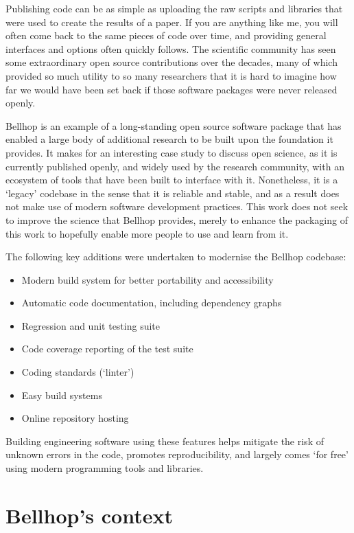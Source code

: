\documentclass[twocolumn]{willarticle}
\begin{document}
Publishing code can be as simple as uploading the raw scripts and libraries that were used to create the results of a paper.
If you are anything like me, you will often come back to the same pieces of code over time, and providing general interfaces and options often quickly follows.
The scientific community has seen some extraordinary open source contributions over the decades, many of which provided so much utility to so many researchers that it is hard to imagine how far we would have been set back if those software packages were never released openly.

Bellhop is an example of a long-standing open source software package that has enabled a large body of additional research to be built upon the foundation it provides.
It makes for an interesting case study to discuss open science, as it is currently published openly, and widely used by the research community, with an ecosystem of tools that have been built to interface with it.
Nonetheless, it is a `legacy' codebase in the sense that it is reliable and stable, and as a result does not make use of modern software development practices.
This work does not seek to improve the science that Bellhop provides, merely to enhance the packaging of this work to hopefully enable more people to use and learn from it.

The following key additions were undertaken to modernise the Bellhop codebase:
\begin{itemize}
\item Modern build system for better portability and accessibility
\item Automatic code documentation, including dependency graphs
\item Regression and unit testing suite
\item Code coverage reporting of the test suite
\item Coding standards (`linter')
\item Easy build systems
\item Online repository hosting
\end{itemize}
Building engineering software using these features helps mitigate the risk of unknown errors in the code, promotes reproducibility, and largely comes `for free' using modern programming tools and libraries.

\section{Bellhop's context}
\end{document}
